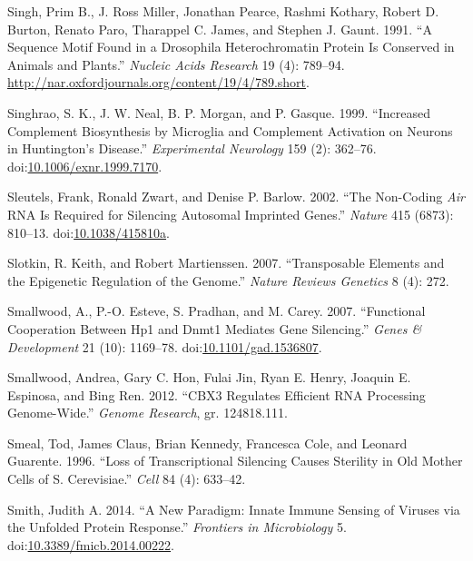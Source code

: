 \documentclass[onehalf,12pt]{beavtex}
\begin{document}
  \hypertarget{ref-Singhsequencemotiffound1991}{}
  Singh, Prim B., J. Ross Miller, Jonathan Pearce, Rashmi Kothary, Robert
  D. Burton, Renato Paro, Tharappel C. James, and Stephen J. Gaunt. 1991.
  ``A Sequence Motif Found in a Drosophila Heterochromatin Protein Is
  Conserved in Animals and Plants.'' \emph{Nucleic Acids Research} 19 (4):
  789--94. \url{http://nar.oxfordjournals.org/content/19/4/789.short}.
  
  \hypertarget{ref-SinghraoIncreasedcomplementbiosynthesis1999}{}
  Singhrao, S. K., J. W. Neal, B. P. Morgan, and P. Gasque. 1999.
  ``Increased Complement Biosynthesis by Microglia and Complement
  Activation on Neurons in Huntington's Disease.'' \emph{Experimental
  Neurology} 159 (2): 362--76.
  doi:\href{https://doi.org/10.1006/exnr.1999.7170}{10.1006/exnr.1999.7170}.
  
  \hypertarget{ref-SleutelsnoncodingAirRNA2002}{}
  Sleutels, Frank, Ronald Zwart, and Denise P. Barlow. 2002. ``The
  Non-Coding \emph{Air} RNA Is Required for Silencing Autosomal Imprinted
  Genes.'' \emph{Nature} 415 (6873): 810--13.
  doi:\href{https://doi.org/10.1038/415810a}{10.1038/415810a}.
  
  \hypertarget{ref-SlotkinTransposableelementsepigenetic2007}{}
  Slotkin, R. Keith, and Robert Martienssen. 2007. ``Transposable Elements
  and the Epigenetic Regulation of the Genome.'' \emph{Nature Reviews
  Genetics} 8 (4): 272.
  
  \hypertarget{ref-SmallwoodFunctionalcooperationHP12007}{}
  Smallwood, A., P.-O. Esteve, S. Pradhan, and M. Carey. 2007.
  ``Functional Cooperation Between Hp1 and Dnmt1 Mediates Gene
  Silencing.'' \emph{Genes \& Development} 21 (10): 1169--78.
  doi:\href{https://doi.org/10.1101/gad.1536807}{10.1101/gad.1536807}.
  
  \hypertarget{ref-SmallwoodCBX3regulatesefficient2012}{}
  Smallwood, Andrea, Gary C. Hon, Fulai Jin, Ryan E. Henry, Joaquin E.
  Espinosa, and Bing Ren. 2012. ``CBX3 Regulates Efficient RNA Processing
  Genome-Wide.'' \emph{Genome Research}, gr. 124818.111.
  
  \hypertarget{ref-SmealLosstranscriptionalsilencing1996}{}
  Smeal, Tod, James Claus, Brian Kennedy, Francesca Cole, and Leonard
  Guarente. 1996. ``Loss of Transcriptional Silencing Causes Sterility in
  Old Mother Cells of S. Cerevisiae.'' \emph{Cell} 84 (4): 633--42.
  
  \hypertarget{ref-Smithnewparadigminnate2014}{}
  Smith, Judith A. 2014. ``A New Paradigm: Innate Immune Sensing of
  Viruses via the Unfolded Protein Response.'' \emph{Frontiers in
  Microbiology} 5.
  doi:\href{https://doi.org/10.3389/fmicb.2014.00222}{10.3389/fmicb.2014.00222}.
  
\end{document}
